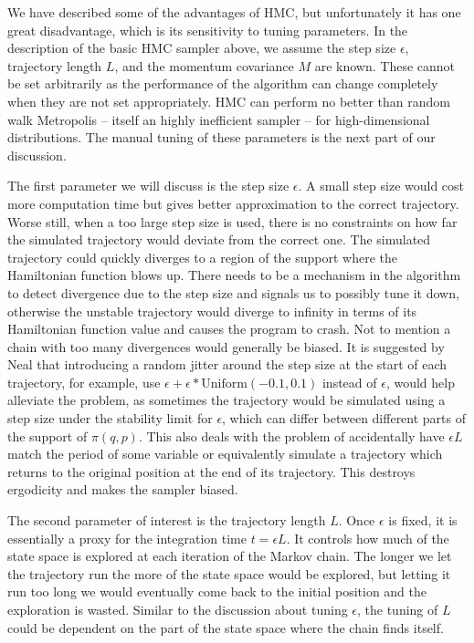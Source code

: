 \documentclass[]{report}
\begin{document}
We have described some of the advantages of HMC, but unfortunately it has one great disadvantage, which is its sensitivity to tuning parameters. 
In the description of the basic HMC sampler above, we assume the step size $\epsilon$, trajectory length $L$, and the momentum covariance $M$ are known. These cannot be set arbitrarily as the performance of the algorithm can change completely when they are not set appropriately. HMC can perform no better than random walk Metropolis -- itself an highly inefficient sampler -- for high-dimensional distributions. The manual tuning of these parameters is the next part of our discussion. 

The first parameter we will discuss is the step size $\epsilon$. A small step size would cost more computation time but gives better approximation to the correct trajectory. Worse still, when a too large step size is used, there is no constraints on how far the simulated trajectory would deviate from the correct one. The simulated trajectory could quickly diverges to a region of the support where the Hamiltonian function blows up. There needs to be a mechanism in the algorithm to detect divergence due to the step size and signals us to possibly tune it down, otherwise the unstable trajectory would diverge to infinity in terms of its Hamiltonian function value and causes the program to crash. Not to mention a chain with too many divergences would generally be biased. It is suggested by Neal that introducing a random jitter around the step size at the start of each trajectory, for example, use $\epsilon + \epsilon*\text{Uniform}(-0.1,0.1)$ instead of $\epsilon$,  would help alleviate the problem, as sometimes the trajectory would be simulated using a step size under the stability limit for $\epsilon$, which can differ between different parts of the support of $\pi(q,p)$. This also deals with the problem of accidentally have $\epsilon L$ match the period of some variable or equivalently simulate a trajectory which returns to the original position at the end of its trajectory. This destroys ergodicity and makes the sampler biased. 

The second parameter of interest is the trajectory length $L$. Once $\epsilon$ is fixed, it is essentially a proxy for the integration time $t= \epsilon L$. It controls how much of the state space is explored at each iteration of the Markov chain. The longer we let the trajectory run the more of the state space would be explored, but letting it run too long we would eventually come back to the initial position and the exploration is wasted. Similar to the discussion about tuning $\epsilon$, the tuning of $L$ could be dependent on the part of the state space where the chain finds itself.
\end{document}
